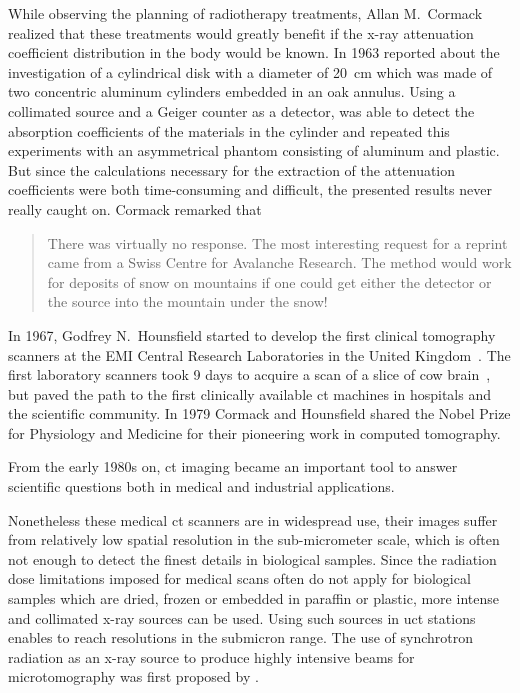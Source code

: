 While observing the planning of radiotherapy treatments, Allan M.\ Cormack realized that these treatments would greatly benefit if the x-ray attenuation coefficient distribution in the body would be known. In 1963 \citet{Cormack1963} reported about the investigation of a cylindrical disk with a diameter of \SI{20}{\centi\meter} which was made of two concentric aluminum cylinders embedded in an oak annulus. Using a collimated  source and a Geiger counter as a detector, \citeauthor{Cormack1963} was able to detect the absorption coefficients of the materials in the cylinder and repeated this experiments with an asymmetrical phantom consisting of aluminum and plastic. But since the calculations necessary for the extraction of the attenuation coefficients were both time-consuming and difficult, the presented results never really caught on. Cormack remarked that \begin{quote} There was virtually no response. The most interesting request for a reprint came from a Swiss Centre for Avalanche Research. The method would work for deposits of snow on mountains if one could get either the detector or the source into the mountain under the snow! \cite{Cormack1979}\end{quote}

In 1967, Godfrey N.\ Hounsfield started to develop the first clinical tomography scanners at the EMI Central Research Laboratories in the United Kingdom~\cite{Hsieh2003}. The first laboratory scanners took 9 days to acquire a scan of a slice of cow brain~\cite{Hounsfield1976}, but paved the path to the first clinically available \ac{ct} machines in hospitals and the scientific community. In 1979 Cormack and Hounsfield shared the Nobel Prize for Physiology and Medicine for their pioneering work in computed tomography.

From the early 1980s on, \ac{ct} imaging became an important tool to answer scientific questions both in medical and industrial applications.

Nonetheless these medical \ac{ct} scanners are in widespread use, their images suffer from relatively low spatial resolution in the sub-micrometer scale, which is often not enough to detect the finest details in biological samples. Since the radiation dose limitations imposed for medical scans often do not apply for biological samples which are dried, frozen or embedded in paraffin or plastic, more intense and collimated x-ray sources can be used. Using such sources in \ac{uct} stations enables to reach resolutions in the submicron range. The use of synchrotron radiation as an x-ray source to produce highly intensive beams for microtomography was first proposed by \citet{Grodzins1983,Grodzins1983a}.

